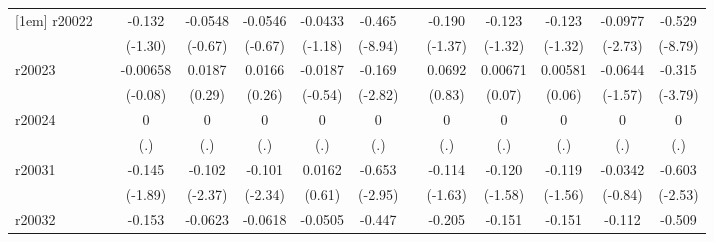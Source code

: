 {\begin{tabular}{l*{12}{c}}
[1em]
r20022      &                     &      -0.132         &     -0.0548         &     -0.0546         &     -0.0433         &      -0.465\sym{***}&                     &      -0.190         &      -0.123         &      -0.123         &     -0.0977\sym{**} &      -0.529\sym{***}\\
            &                     &     (-1.30)         &     (-0.67)         &     (-0.67)         &     (-1.18)         &     (-8.94)         &                     &     (-1.37)         &     (-1.32)         &     (-1.32)         &     (-2.73)         &     (-8.79)         \\
[1em]
r20023      &                     &    -0.00658         &      0.0187         &      0.0166         &     -0.0187         &      -0.169\sym{**} &                     &      0.0692         &     0.00671         &     0.00581         &     -0.0644         &      -0.315\sym{***}\\
            &                     &     (-0.08)         &      (0.29)         &      (0.26)         &     (-0.54)         &     (-2.82)         &                     &      (0.83)         &      (0.07)         &      (0.06)         &     (-1.57)         &     (-3.79)         \\
[1em]
r20024      &                     &           0         &           0         &           0         &           0         &           0         &                     &           0         &           0         &           0         &           0         &           0         \\
            &                     &         (.)         &         (.)         &         (.)         &         (.)         &         (.)         &                     &         (.)         &         (.)         &         (.)         &         (.)         &         (.)         \\
[1em]
r20031      &                     &      -0.145         &      -0.102\sym{*}  &      -0.101\sym{*}  &      0.0162         &      -0.653\sym{**} &                     &      -0.114         &      -0.120         &      -0.119         &     -0.0342         &      -0.603\sym{*}  \\
            &                     &     (-1.89)         &     (-2.37)         &     (-2.34)         &      (0.61)         &     (-2.95)         &                     &     (-1.63)         &     (-1.58)         &     (-1.56)         &     (-0.84)         &     (-2.53)         \\
[1em]
r20032      &                     &      -0.153         &     -0.0623         &     -0.0618         &     -0.0505         &      -0.447\sym{***}&                     &      -0.205         &      -0.151         &      -0.151         &      -0.112\sym{**} &      -0.509\sym{***}\\

\end{tabular}}
